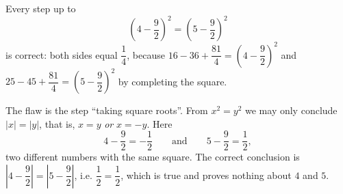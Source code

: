 Every step up to
\[\left(4-\dfrac92\right)^2=\left(5-\dfrac92\right)^2\]
is correct: both sides equal $\dfrac14$, because $16-36+\dfrac{81}4=\left(4-\dfrac92\right)^2$ and $25-45+\dfrac{81}{4}=\left(5-\dfrac92\right)^2$ by completing the square.

The flaw is the step ``taking square roots''. From $x^2=y^2$ we may only conclude $|x|=|y|$, that is, $x=y$ \emph{or} $x=-y$. Here
\[4-\dfrac92=-\dfrac12\qquad\text{and}\qquad5-\dfrac92=\dfrac12,\]
two different numbers with the same square. The correct conclusion is $\left|4-\dfrac92\right|=\left|5-\dfrac92\right|$, i.e. $\dfrac12=\dfrac12$, which is true and proves nothing about $4$ and $5$.
